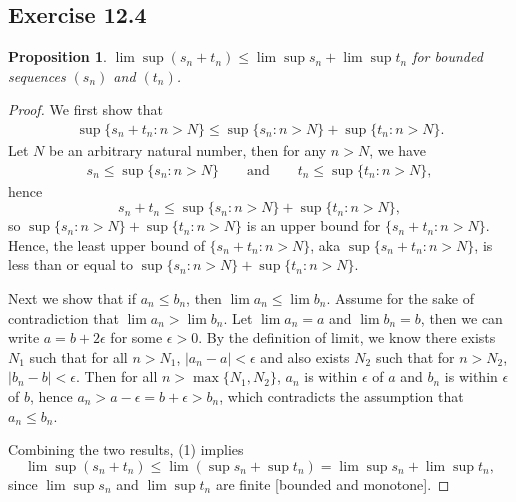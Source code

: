 \documentclass{article}
\newtheorem{proposition}[thm]{Proposition}
\begin{document}
\subsection*{Exercise 12.4}
\begin{proposition}
    $\lim\sup(s_n+t_n)\le \lim\sup s_n + \lim\sup t_n$ for bounded sequences $(s_n)$ and $(t_n)$.
\end{proposition}
\begin{proof}
    We first show that 
    \begin{align}
        \sup\{s_n+t_n:n>N\}\le\sup\{s_n:n>N\}+\sup\{t_n:n>N\}.
    \end{align}
    Let $N$ be an arbitrary natural number, then for any $n>N$, we have 
    \begin{align*}
        s_n \le \sup\{s_n:n>N\} \qquad \text{and} \qquad t_n \le \sup\{t_n:n>N\},
    \end{align*}
    hence
    $$s_n+t_n\le \sup\{s_n:n>N\}+\sup\{t_n:n>N\},$$
    so $\sup\{s_n:n>N\}+\sup\{t_n:n>N\}$ is an upper bound for $\{s_n+t_n:n>N\}$. Hence, the 
    least upper bound of $\{s_n+t_n:n>N\}$, aka $\sup\{s_n+t_n:n>N\}$, is less than or equal to
    $\sup\{s_n:n>N\}+\sup\{t_n:n>N\}$.

    Next we show that if $a_n \le b_n$, then $\lim a_n \le \lim b_n$. 
    Assume for the sake of contradiction that $\lim a_n > \lim b_n$. Let $\lim a_n = a$ and 
    $\lim b_n = b$, then we can write $a = b + 2\epsilon$ for some $\epsilon > 0$. By the 
    definition of limit, we know there exists $N_1$ such that for all $n>N_1$, $|a_n - a| <
    \epsilon$ and also exists $N_2$ such that for $n>N_2$, $|b_n - b| < \epsilon$. Then for all 
    $n>\max\{N_1,N_2\}$, $a_n$ is within $\epsilon$ of $a$ and $b_n$ is within $\epsilon$ of $b$, 
    hence $a_n > a-\epsilon = b + \epsilon > b_n$, which contradicts the assumption that $a_n \le b_n$.

    Combining the two results, (1)
    implies $$\lim\sup(s_n+t_n)\le \lim(\sup s_n + \sup t_n) = \lim\sup s_n + \lim\sup t_n,$$ 
    since $\lim\sup s_n$ and $\lim\sup t_n$ are finite [bounded and monotone].
\end{proof}
\end{document}

